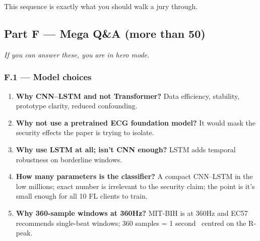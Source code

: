 \documentclass[11pt,a4paper]{article}
\begin{document}
This sequence is exactly what you should walk a jury through.

\subsection{Part F --- Mega Q\&A (more than 50)}

\textit{If you can answer these, you are in hero mode.}

\subsubsection{F.1 --- Model choices}
\begin{enumerate}
\item \textbf{Why CNN--LSTM and not Transformer?} Data efficiency, stability, prototype clarity, reduced confounding.
\item \textbf{Why not use a pretrained ECG foundation model?} It would mask the security effects the paper is trying to isolate.
\item \textbf{Why use LSTM at all; isn't CNN enough?} LSTM adds temporal robustness on borderline windows.
\item \textbf{How many parameters is the classifier?} A compact CNN--LSTM in the low millions; exact number is irrelevant to the security claim; the point is it's small enough for all 10 FL clients to train.
\item \textbf{Why 360-sample windows at 360Hz?} MIT-BIH is at 360Hz and EC57 recommends single-beat windows; 360 samples = 1 second ~centred on the R-peak.
\end{enumerate}
\end{document}
